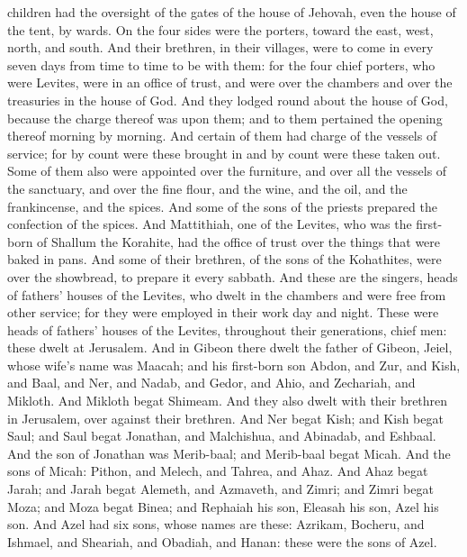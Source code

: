 children had the oversight of the gates of the house of Jehovah, even the house of the tent, by wards. On the four sides were the porters, toward the east, west, north, and south. And their brethren, in their villages, were to come in every seven days from time to time to be with them: for the four chief porters, who were Levites, were in an office of trust, and were over the chambers and over the treasuries in the house of God. And they lodged round about the house of God, because the charge thereof was upon them; and to them pertained the opening thereof morning by morning.  And certain of them had charge of the vessels of service; for by count were these brought in and by count were these taken out. Some of them also were appointed over the furniture, and over all the vessels of the sanctuary, and over the fine flour, and the wine, and the oil, and the frankincense, and the spices. And some of the sons of the priests prepared the confection of the spices. And Mattithiah, one of the Levites, who was the first-born of Shallum the Korahite, had the office of trust over the things that were baked in pans. And some of their brethren, of the sons of the Kohathites, were over the showbread, to prepare it every sabbath.  And these are the singers, heads of fathers’ houses of the Levites, who dwelt in the chambers and were free from other service; for they were employed in their work day and night. These were heads of fathers’ houses of the Levites, throughout their generations, chief men: these dwelt at Jerusalem.  And in Gibeon there dwelt the father of Gibeon, Jeiel, whose wife’s name was Maacah; and his first-born son Abdon, and Zur, and Kish, and Baal, and Ner, and Nadab, and Gedor, and Ahio, and Zechariah, and Mikloth. And Mikloth begat Shimeam. And they also dwelt with their brethren in Jerusalem, over against their brethren. And Ner begat Kish; and Kish begat Saul; and Saul begat Jonathan, and Malchishua, and Abinadab, and Eshbaal. And the son of Jonathan was Merib-baal; and Merib-baal begat Micah. And the sons of Micah: Pithon, and Melech, and Tahrea, and Ahaz. And Ahaz begat Jarah; and Jarah begat Alemeth, and Azmaveth, and Zimri; and Zimri begat Moza; and Moza begat Binea; and Rephaiah his son, Eleasah his son, Azel his son. And Azel had six sons, whose names are these: Azrikam, Bocheru, and Ishmael, and Sheariah, and Obadiah, and Hanan: these were the sons of Azel. 

